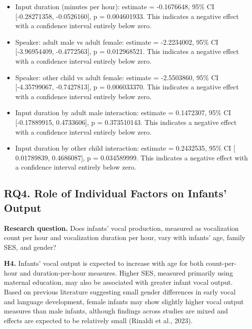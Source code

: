 \documentclass[
  letterpaper,
  DIV=11,
  numbers=noendperiod]{scrartcl}
\providecommand{\tightlist}{%
  \setlength{\itemsep}{0pt}\setlength{\parskip}{0pt}}\usepackage{longtable,booktabs,array}
\begin{document}
\begin{itemize}
\tightlist
\item
  Input duration (minutes per hour): estimate = -0.1676648, 95\% CI
  {[}-0.28271358, -0.0526160{]}, p = 0.004601933. This indicates a
  negative effect with a confidence interval entirely below zero.
\item
  Speaker: adult male vs adult female: estimate = -2.2234002, 95\% CI
  {[}-3.96954409, -0.4772563{]}, p = 0.012968521. This indicates a
  negative effect with a confidence interval entirely below zero.
\item
  Speaker: other child vs adult female: estimate = -2.5503860, 95\% CI
  {[}-4.35799067, -0.7427813{]}, p = 0.006033370. This indicates a
  negative effect with a confidence interval entirely below zero.
\item
  Input duration by adult male interaction: estimate = 0.1472307, 95\%
  CI {[}-0.17889915, 0.4733606{]}, p = 0.373510143. This indicates a
  negative effect with a confidence interval entirely below zero.
\item
  Input duration by other child interaction: estimate = 0.2432535, 95\%
  CI {[} 0.01789839, 0.4686087{]}, p = 0.034589999. This indicates a
  negative effect with a confidence interval entirely below zero.
\end{itemize}

\hypertarget{rq4.-role-of-individual-factors-on-infants-output}{%
\subsection{RQ4. Role of Individual Factors on Infants'
Output}\label{rq4.-role-of-individual-factors-on-infants-output}}

\textbf{Research question.} Does infants' vocal production, measured as
vocalization count per hour and vocalization duration per hour, vary
with infants' age, family SES, and gender?

\textbf{H4.} Infants' vocal output is expected to increase with age for
both count-per-hour and duration-per-hour measures. Higher SES, measured
primarily using maternal education, may also be associated with greater
infant vocal output. Based on previous literature suggesting small
gender differences in early vocal and language development, female
infants may show slightly higher vocal output measures than male
infants, although findings across studies are mixed and effects are
expected to be relatively small (Rinaldi et al., 2023).
\end{document}
